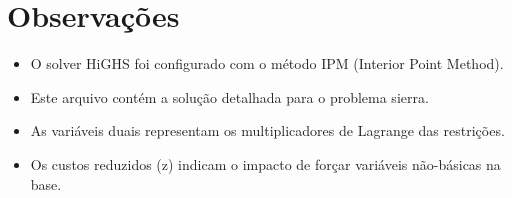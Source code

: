 \documentclass[12pt]{article}
\begin{document}
\section{Observações}

\begin{itemize}
\item O solver HiGHS foi configurado com o método IPM (Interior Point Method).
\item Este arquivo contém a solução detalhada para o problema sierra.
\item As variáveis duais representam os multiplicadores de Lagrange das restrições.
\item Os custos reduzidos (z) indicam o impacto de forçar variáveis não-básicas na base.
\end{itemize}
\end{document}
